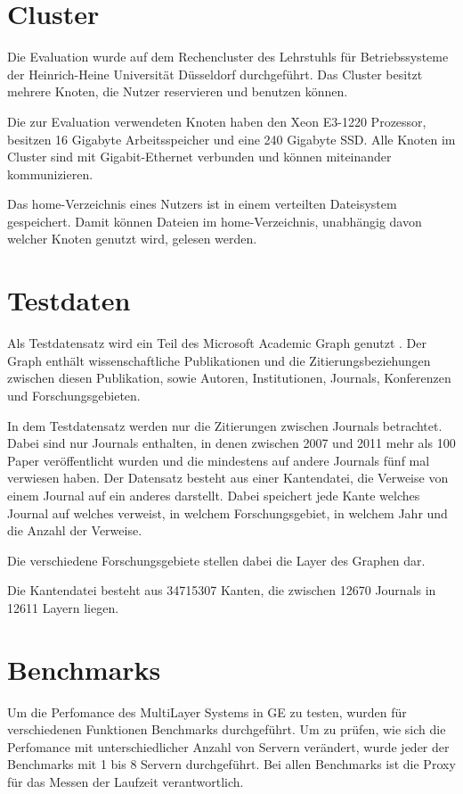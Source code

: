 
\section{Cluster}
\label{cluster}

Die Evaluation wurde auf dem Rechencluster des Lehrstuhls für Betriebssysteme der Heinrich-Heine Universität Düsseldorf durchgeführt.
Das Cluster besitzt mehrere Knoten, die Nutzer reservieren und benutzen können.

Die zur Evaluation verwendeten Knoten haben den Xeon E3-1220 Prozessor, besitzen 16 Gigabyte Arbeitsspeicher und eine 240 Gigabyte SSD.
Alle Knoten im Cluster sind mit Gigabit-Ethernet verbunden und können miteinander kommunizieren. 

Das home-Verzeichnis eines Nutzers ist in einem verteilten Dateisystem gespeichert. Damit können Dateien im home-Verzeichnis, unabhängig davon welcher Knoten genutzt wird, gelesen werden.

\section{Testdaten}


Als Testdatensatz wird ein Teil des Microsoft Academic Graph genutzt \cite{sinha2015an}. Der Graph enthält wissenschaftliche Publikationen und die Zitierungsbeziehungen zwischen diesen Publikation, sowie Autoren, Institutionen, Journals, Konferenzen und Forschungsgebieten.

In dem Testdatensatz werden nur die Zitierungen zwischen Journals betrachtet. Dabei sind nur Journals enthalten, in denen zwischen 2007 und 2011 mehr als 100 Paper veröffentlicht wurden und die mindestens auf andere Journals fünf mal verwiesen haben.
Der Datensatz besteht aus einer Kantendatei, die Verweise von einem Journal auf ein anderes darstellt. Dabei speichert jede Kante welches Journal auf welches verweist, in welchem Forschungsgebiet, in welchem Jahr und die Anzahl der Verweise.

Die verschiedene Forschungsgebiete stellen dabei die Layer des Graphen dar.

Die Kantendatei besteht aus 34715307 Kanten, die zwischen 12670 Journals in 12611 Layern liegen.


\section{Benchmarks}

Um die Perfomance des MultiLayer Systems in GE zu testen, wurden für verschiedenen Funktionen Benchmarks durchgeführt. Um zu prüfen, wie sich die Perfomance mit unterschiedlicher Anzahl von Servern verändert,
wurde jeder der Benchmarks mit 1 bis 8 Servern durchgeführt. Bei allen Benchmarks ist die Proxy für das Messen der Laufzeit verantwortlich.

